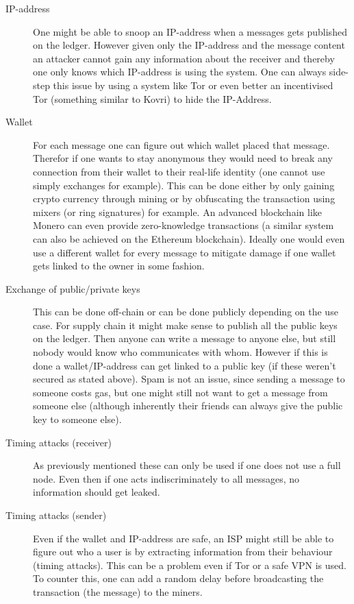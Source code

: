 \documentclass[a4paper]{article} %
\begin{document}
\begin{description}
    \item[IP-address] One might be able to snoop an IP-address when a messages gets published on the ledger. However given only the IP-address and the message content an attacker cannot gain any information about the receiver and thereby one only knows which IP-address is using the system. One can always side-step this issue by using a system like Tor or even better an incentivised Tor (something similar to Kovri) to hide the IP-Address.
    
    \item[Wallet] For each message one can figure out which wallet placed that message. Therefor if one wants to stay anonymous they would need to break any connection from their wallet to their real-life identity (one cannot use simply exchanges for example). This can be done either by only gaining crypto currency through mining or by obfuscating the transaction using mixers (or ring signatures) for example. An advanced blockchain like Monero can even provide zero-knowledge transactions (a similar system can also be achieved on the Ethereum blockchain). Ideally one would even use a different wallet for every message to mitigate damage if one wallet gets linked to the owner in some fashion.
    
    \item[Exchange of public/private keys] This can be done off-chain or can be done publicly depending on the use case. For supply chain it might make sense to publish all the public keys on the ledger. Then anyone can write a message to anyone else, but still nobody would know who communicates with whom. However if this is done a wallet/IP-address can get linked to a public key (if these weren't secured as stated above). Spam is not an issue, since sending a message to someone costs gas, but one might still not want to get a message from someone else (although inherently their friends can always give the public key to someone else).
    
    
 
    \item[Timing attacks (receiver)] As previously mentioned these can only be used if one does not use a full node. Even then if one acts indiscriminately to all messages, no information should get leaked. 
    
    \item[Timing attacks (sender)] Even if the wallet and IP-address are safe, an ISP might still be able to figure out who a user is by extracting information from their behaviour (timing attacks). This can be a problem even if Tor or a safe VPN is used. To counter this, one can add a random delay before broadcasting the transaction (the message) to the miners.
    

\end{description}
\end{document}
